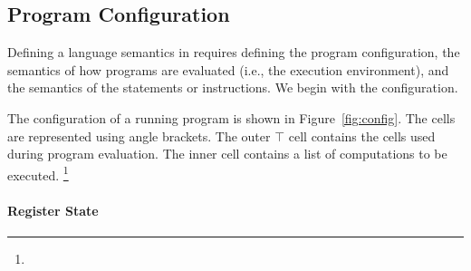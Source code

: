 


\subsection{Program Configuration}\label{sec:x86sema}
Defining a language semantics in \K requires defining the program configuration, the semantics of how programs are evaluated (i.e., the execution environment), and the semantics of the statements or instructions.  We begin with the configuration.



The \K configuration of a running \ISA program is shown in Figure~\ref{fig:config}. The cells are represented using angle brackets. The outer $\top$ cell contains the cells used during program evaluation.
The inner  cell contains a list of computations to be executed. \footnote{%
}

\paragraph{Register State}

